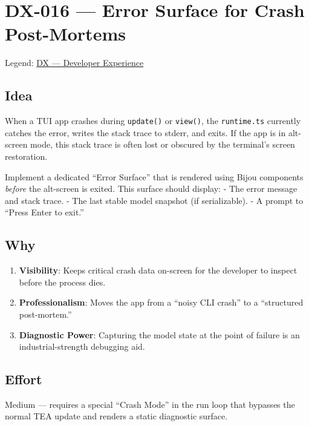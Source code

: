 \chapter{DX-016 --- Error Surface for Crash Post-Mortems}\label{record-322}

\smallskip

Legend: \href{https://github.com/flyingrobots/bijou/blob/cbd70612140e7a450d764b3c7be1c6af878b99bc/docs/method/graveyard/legends/DX-developer-experience.md}{DX --- Developer Experience}

\section{Idea}\label{record-322-idea}

When a TUI app crashes during \texttt{u\allowbreak{}p\allowbreak{}d\allowbreak{}a\allowbreak{}t\allowbreak{}e\allowbreak{}(\allowbreak{})} or \texttt{v\allowbreak{}i\allowbreak{}e\allowbreak{}w\allowbreak{}(\allowbreak{})}, the \texttt{r\allowbreak{}u\allowbreak{}n\allowbreak{}t\allowbreak{}i\allowbreak{}m\allowbreak{}e\allowbreak{}.\allowbreak{}t\allowbreak{}s} currently catches the error, writes the stack trace to stderr, and exits. If the app is in alt-screen mode, this stack trace is often lost or obscured by the terminal's screen restoration.

Implement a dedicated ``Error Surface'' that is rendered using Bijou components \emph{before} the alt-screen is exited. This surface should display: - The error message and stack trace. - The last stable model snapshot (if serializable). - A prompt to ``Press Enter to exit.''

\section{Why}\label{record-322-why}

\begin{enumerate}
\def\labelenumi{\arabic{enumi}.}
\tightlist
\item
  \textbf{Visibility}: Keeps critical crash data on-screen for the developer to inspect before the process dies.
\item
  \textbf{Professionalism}: Moves the app from a ``noisy CLI crash'' to a ``structured post-mortem.''
\item
  \textbf{Diagnostic Power}: Capturing the model state at the point of failure is an industrial-strength debugging aid.
\end{enumerate}

\section{Effort}\label{record-322-effort}

Medium --- requires a special ``Crash Mode'' in the run loop that bypasses the normal TEA update and renders a static diagnostic surface.

